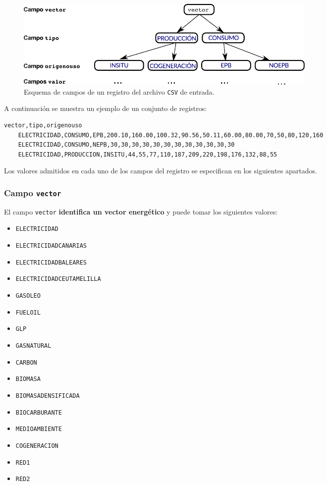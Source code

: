 \documentclass[10pt,notitlepage,oneside,a4paper]{article}
\begin{document}
\begin{figure}[H]
\centering
\includegraphics[width=15cm]{esquemavectores}
\caption{Esquema de campos de un registro del archivo \texttt{CSV} de entrada.}
\label{fig:estructuraVectores}
\end{figure}

A continuación se muestra un ejemplo de un conjunto de registros:

\begin{Verbatim}[fontsize=\small,frame=single]
    vector,tipo,origenouso
    ELECTRICIDAD,CONSUMO,EPB,200.10,160.00,100.32,90.56,50.11,60.00,80.00,70,50,80,120,160
    ELECTRICIDAD,CONSUMO,NEPB,30,30,30,30,30,30,30,30,30,30,30,30
    ELECTRICIDAD,PRODUCCION,INSITU,44,55,77,110,187,209,220,198,176,132,88,55
\end{Verbatim}

Los valores admitidos en cada uno de los campos del registro se especifican en los siguientes apartados.

\subsubsection{Campo \texttt{vector}}

El campo \texttt{vector} \textbf{identifica un vector energético} y puede tomar los siguientes valores:

\begin{multicols}{3}
\begin{itemize}
\item \texttt{ELECTRICIDAD}
\item \texttt{ELECTRICIDADCANARIAS}
\item \texttt{ELECTRICIDADBALEARES}
\item \texttt{ELECTRICIDADCEUTAMELILLA}
\item \texttt{GASOLEO}
\item \texttt{FUELOIL}
\item \texttt{GLP}
\item \texttt{GASNATURAL}
\item \texttt{CARBON}
\item \texttt{BIOMASA}
\item \texttt{BIOMASADENSIFICADA}
\item \texttt{BIOCARBURANTE}
\item \texttt{MEDIOAMBIENTE}
\item \texttt{COGENERACION}
\item \texttt{RED1}
\item \texttt{RED2}
\end{itemize}
\end{multicols}
\end{document}
